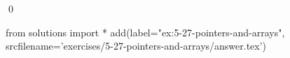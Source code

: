 
\begin{ex}
  \label{ex:5-27-pointers-and-arrays}
  
  \qed
\end{ex}
\begin{python0}
from solutions import *
add(label="ex:5-27-pointers-and-arrays",
    srcfilename='exercises/5-27-pointers-and-arrays/answer.tex')
\end{python0}
